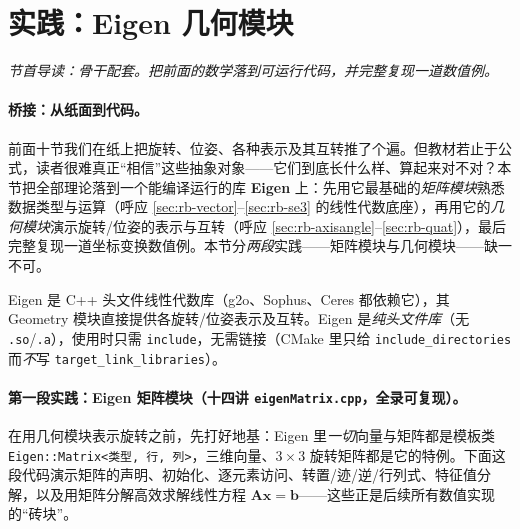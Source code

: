 \section{实践：Eigen 几何模块}
\label{sec:rb-eigen}
\noindent\emph{节首导读：骨干配套。把前面的数学落到可运行代码，并完整复现一道数值例。}

\paragraph{桥接：从纸面到代码。}前面十节我们在纸上把旋转、位姿、各种表示及其互转推了个遍。但教材若止于公式，读者很难真正“相信”这些抽象对象——它们到底长什么样、算起来对不对？本节把全部理论落到一个能编译运行的库 \textbf{Eigen} 上：先用它最基础的\emph{矩阵模块}熟悉数据类型与运算（呼应 \cref{sec:rb-vector}--\cref{sec:rb-se3} 的线性代数底座），再用它的\emph{几何模块}演示旋转/位姿的表示与互转（呼应 \cref{sec:rb-axisangle}--\cref{sec:rb-quat}），最后完整复现一道坐标变换数值例。本节分\emph{两段}实践——矩阵模块与几何模块——缺一不可\cite{gaoxiang2019slam14}。

Eigen 是 C++ 头文件线性代数库（g2o、Sophus、Ceres 都依赖它），其 Geometry 模块直接提供各旋转/位姿表示及互转。Eigen 是\emph{纯头文件库}（无 \texttt{.so}/\allowbreak\texttt{.a}），使用时只需 \texttt{include}，无需链接（CMake 里只给 \texttt{include\_directories} 而\emph{不}写 \texttt{target\_link\_libraries}）\cite{gaoxiang2019slam14}。

\paragraph{第一段实践：Eigen 矩阵模块（十四讲 \texttt{eigenMatrix.\allowbreak cpp}，全录可复现）。}在用几何模块表示旋转之前，先打好地基：Eigen 里\emph{一切}向量与矩阵都是模板类 \texttt{Eigen::Matrix<类型, 行, 列>}，三维向量、$3\times3$ 旋转矩阵都是它的特例。下面这段代码演示矩阵的声明、初始化、逐元素访问、转置/迹/逆/行列式、特征值分解，以及用矩阵分解高效求解线性方程 $\mathbf{A}\mathbf{x}=\mathbf{b}$——这些正是后续所有数值实现的“砖块”。

